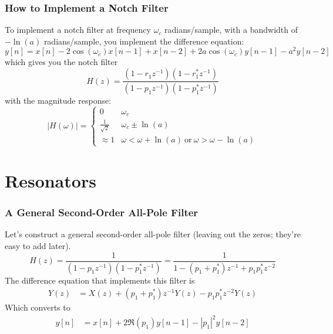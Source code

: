 \documentclass{beamer}
\begin{document}
\begin{frame}
  \frametitle{How to Implement a Notch Filter}

  To implement a notch filter at frequency $\omega_c$ radians/sample,
  with a bandwidth of $-\ln(a)$ radians/sample, you implement the difference equation:
  \begin{displaymath}
    y[n] = x[n]-2\cos(\omega_c)x[n-1]+x[n-2]+2a\cos(\omega_c)y[n-1]-a^2y[n-2]
  \end{displaymath}
  which gives you the notch filter
  \begin{displaymath}
    H(z) = \frac{(1-r_1z^{-1})(1-r_1^*z^{-1})}{(1-p_1z^{-1})(1-p_1^*z^{-1})}
  \end{displaymath}
  with the magnitude response:
  \begin{displaymath}
    |H(\omega)| =\begin{cases}
    0 & \omega_c\\
    \frac{1}{\sqrt{2}} & \omega_c \pm \ln(a)\\
    \approx 1 & \omega < \omega+\ln(a)~\mbox{or}~\omega > \omega-\ln(a)
    \end{cases}
  \end{displaymath}
\end{frame}

\section[Resonators]{Resonators}
\setcounter{subsection}{1}

\begin{frame}
  \frametitle{A General Second-Order All-Pole Filter}

  Let's construct a general second-order all-pole filter (leaving out
  the zeros; they're easy to add later).
  \[
  H(z) = \frac{1}{(1-p_1z^{-1})(1-p_1^*z^{-1})}= \frac{1}{1-(p_1+p_1^*)z^{-1}+p_1p_1^*z^{-2}}
  \]
  The difference equation that implements this filter is
  \begin{align*}
    Y(z) &= X(z) + (p_1+p_1^*)z^{-1}Y(z) -p_1p_1^*z^{-2}Y(z)
  \end{align*}
  Which converts to
  \begin{align*}
    y[n] &= x[n] + 2\Re(p_1)y[n-1] - |p_1|^2 y[n-2]
  \end{align*}
\end{frame}
\end{document}
